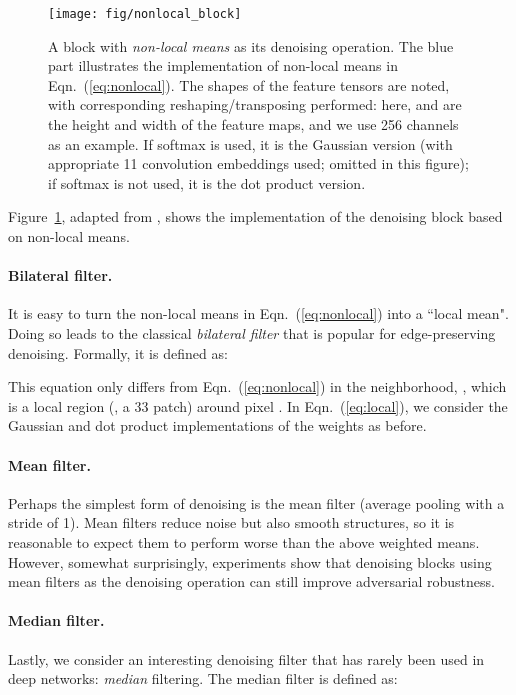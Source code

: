 \documentclass[10pt,twocolumn,letterpaper]{article}
\begin{document}
\begin{figure}[t]
\centering
\texttt{[image: fig/nonlocal\_block]}
\caption{A block with \emph{non-local means} as its denoising operation. The blue part illustrates the implementation of non-local means in Eqn.~(\ref{eq:nonlocal}). The shapes of the feature tensors are noted, with corresponding reshaping/transposing performed: here,  and  are the height and width of the feature maps, and we use 256 channels as an example.
If softmax is used, it is the Gaussian version (with appropriate 11 convolution embeddings used; omitted in this figure); if softmax is not used, it is the dot product version.}
\vspace{-.1em}
\label{fig:nonlocal_block}
\end{figure}


\noindent Figure~\ref{fig:nonlocal_block}, adapted from \cite{Wang2018}, shows the implementation of the denoising block based on non-local means.

\paragraph{Bilateral filter.} It is easy to turn the non-local means in Eqn.~(\ref{eq:nonlocal}) into a ``local mean". Doing so leads to the classical \emph{bilateral filter} \cite{Tomasi1998} that is popular for edge-preserving denoising. Formally, it is defined as:

This equation only differs from Eqn.~(\ref{eq:nonlocal}) in the neighborhood, , which is a local region (\eg, a 33 patch) around pixel . In Eqn.~(\ref{eq:local}), we consider the Gaussian and dot product implementations of the weights as before.

\paragraph{Mean filter.} Perhaps the simplest form of denoising is the mean filter (average pooling with a stride of 1). Mean filters reduce noise but also smooth structures, so it is reasonable to expect them to perform worse than the above weighted means. However, somewhat surprisingly, experiments show that denoising blocks using mean filters as the denoising operation can still improve adversarial robustness.

\paragraph{Median filter.} Lastly, we consider an interesting denoising filter that has rarely been used in deep networks: \emph{median} filtering. The median filter is defined as:
\end{document}

